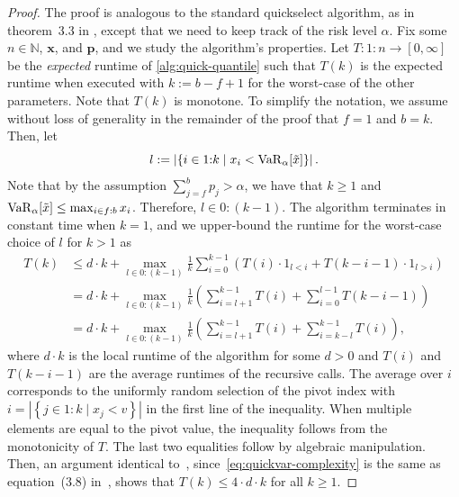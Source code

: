 \begin{proof}
The proof is analogous to the standard quickselect algorithm, as in theorem~3.3 in \citet{horowitz1998computer}, except that we need to keep track of the risk level $\alpha$. Fix some $n \in \mathbb{N}$, $\bm{x}$, and $\bm{p}$, and we study the algorithm's properties. Let $T\colon 1{:}n \to [0,\infty]$ be the \emph{expected} runtime of \cref{alg:quick-quantile} such that $T(k)$ is the expected runtime when executed with $k := b - f + 1$ for the worst-case of the other parameters. Note that $T(k)$ is monotone.  To simplify the notation, we assume without loss of generality in the remainder of the proof that $f = 1$ and $b = k$. Then, let
\[
  l := \left| \left\{ i \in 1{:}k \mid  x_i < \operatorname{VaR}_{\alpha}[\tilde{x}]\right\}   \right|.
\]
Note that by the assumption $\sum_{j = f}^b p_j > \alpha$, we have that $k \ge 1$ and $\operatorname{VaR}_{\alpha}[\tilde{x}] \le \max_{i\in f{:}b} x_i$. Therefore, $l \in 0{:}(k-1)$. The algorithm terminates in constant time when $k = 1$, and we upper-bound the runtime for the worst-case choice of $l$ for $k > 1$ as
\begin{align}
\nonumber
  T(k)
  &\le d\cdot k + \max_{l\in 0{:}(k-1)} \frac{1}{k} \sum_{i=0}^{k-1} \left(   T(i) \cdot 1_{l < i} + T(k - i - 1) \cdot 1_{l > i}  \right) \\
\nonumber
  &= d\cdot k + \max_{l\in 0{:}(k-1)} \frac{1}{k}  \left(  \sum_{i=l+1}^{k-1} T(i)  + \sum_{i=0}^{l-1} T(k - i - 1)   \right) \\
\label{eq:quickvar-complexity}
  &= d\cdot k + \max_{l\in 0{:}(k-1)} \frac{1}{k}  \left(  \sum_{i=l+1}^{k-1} T(i)  + \sum_{i=k-l}^{k-1} T(i)   \right),
\end{align}
where $d\cdot k$ is the local runtime of the algorithm for some $d > 0$ and $T(i)$ and $T(k - i - 1)$ are the average runtimes of the recursive calls. The average over $i$ corresponds to the uniformly random selection of the pivot index with $i = \left| \left\{ j \in 1{:}k \mid x_j < v \right\} \right|$ in the first line of the inequality. When multiple elements are equal to the pivot value, the inequality follows from the monotonicity of $T$. The last two equalities follow by algebraic manipulation. Then, an argument identical to~\citet[theorem 3.3]{horowitz1998computer}, since~\eqref{eq:quickvar-complexity} is the same as equation~(3.8) in~\citet{horowitz1998computer}, shows that \(T(k)\le 4\cdot d\cdot k\) for all \(k\ge 1\).
\end{proof}
 
